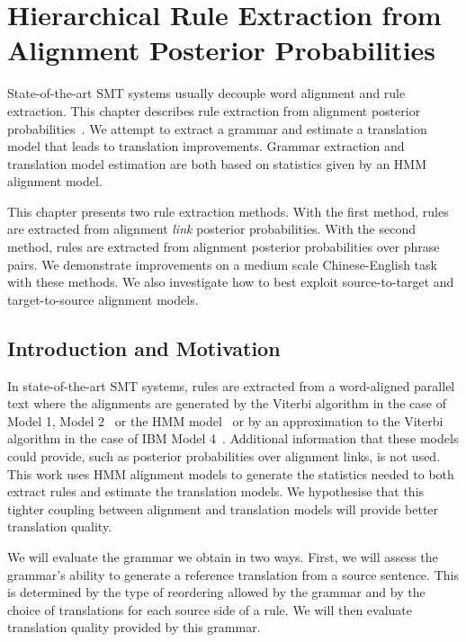 \chapter{Hierarchical Rule Extraction from Alignment Posterior Probabilities}
\label{chap:extractionFromPosteriors}

State-of-the-art SMT systems usually decouple word alignment and rule
extraction. This chapter describes rule extraction from alignment posterior
probabilities~\citep{degispert-pino-byrne:2010:EMNLP}. We attempt to extract a
grammar and estimate a translation model that leads to translation improvements.
Grammar extraction and translation model estimation are both based on statistics
given by an HMM alignment model.

This chapter presents two rule extraction methods. With the first method, rules
are extracted from alignment \emph{link} posterior probabilities. With the second
method, rules are extracted from alignment posterior probabilities
over phrase pairs. We
demonstrate improvements on a medium scale Chinese-English task with these
methods. We also investigate how to best exploit source-to-target and
target-to-source alignment models.

\section{Introduction and Motivation}
\label{sec:extractionFromPosteriorsIntro}

In state-of-the-art SMT systems, rules are extracted from a %
word-aligned parallel text where the alignments are generated by the Viterbi
algorithm in the case of Model 1, Model
2~\citep{brown-dellapietra-dellapietra-mercer-1993} or the HMM
model~\citep{vogel-ney-tillmann} or by an approximation to the Viterbi algorithm
in the case of IBM Model 4~\citep{brown-dellapietra-dellapietra-mercer-1993}.
Additional information that these models could provide, such as posterior
probabilities over alignment links, is not used. This work uses HMM alignment
models to generate the statistics needed to both extract rules and estimate the
translation models. We hypothesise that this tighter coupling between alignment
and translation models will provide better translation quality.

We will evaluate the grammar we obtain in two ways. First, we will assess the
grammar's ability to generate a reference translation from a source sentence.
This is determined by the type of reordering allowed by the grammar and by
the choice of translations for each source side of a rule. We will then evaluate
translation quality provided by this grammar.

